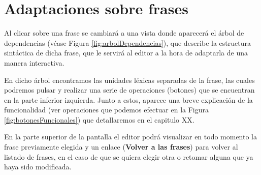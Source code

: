 \section{Adaptaciones sobre frases}

Al clicar  sobre una frase se cambiará a una vista donde aparecerá el árbol de dependencias (véase Figura \ref{fig:arbolDependencias}), que describe la estructura sintáctica de dicha frase, que le servirá al editor a la hora de adaptarla de una manera interactiva. 

En dicho árbol encontramos las unidades léxicas separadas de la frase, las cuales podremos pulsar y realizar una serie de operaciones (botones) que se encuentran en la parte inferior izquierda. Junto a estos, aparece una breve explicación de la funcionalidad (ver operaciones que podemos efectuar en la Figura \ref{fig:botonesFuncionales}) que detallaremos en el capitulo XX. 

En la parte superior de la pantalla el editor podrá visualizar en todo momento la frase previamente elegida y un enlace (\textbf{Volver a las frases}) para volver al listado de frases, en el caso de que se quiera elegir otra o retomar alguna que ya haya sido modificada.

